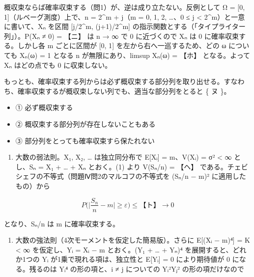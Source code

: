 \documentclass[
  10pt,
  a4paper,
]{article}
\providecommand{\tightlist}{%
  \setlength{\itemsep}{0pt}\setlength{\parskip}{0pt}}
\begin{document}
概収束ならば確率収束する（問1）が、逆は成り立たない。反例として Ω =
{[}0, 1{]}（ルベーグ測度）上で、n = 2\^{}m + j（m = 0, 1, 2, \ldots、0 ≤
j \textless{} 2\^{}m）と一意に書いて、X{\fallbackfont ₙ} を区間
{[}j/2\^{}m, (j+1)/2\^{}m{]}
の指示関数とする（「タイプライター列」）。P(X{\fallbackfont ₙ} ≠ 0) =
【ニ】 は n → ∞ で 0 に近づくので X{\fallbackfont ₙ} は 0
に確率収束する。しかし各 m ごとに区間が {[}0, 1{]}
を左から右へ一巡するため、どの ω についても X{\fallbackfont ₙ}(ω) = 1
となる n が無限にあり、limsup X{\fallbackfont ₙ}(ω) = 【ホ】
となる。よって X{\fallbackfont ₙ} はどの点でも 0 に収束しない。

もっとも、確率収束する列からは必ず概収束する部分列を取り出せる。すなわち、確率収束するが概収束しない列でも、適当な部分列をとると
\{ ヌ \}。

\begin{itemize}
\tightlist
\item
  ① 必ず概収束する
\item
  ② 概収束する部分列が存在しないこともある
\item
  ③ 部分列をとっても確率収束すら保たれない
\end{itemize}

\begin{enumerate}
\def\labelenumi{(\arabic{enumi})}
\setcounter{enumi}{2}
\tightlist
\item
  大数の弱法則。X{\fallbackfont ₁}, X{\fallbackfont ₂}, \ldots{}
  は独立同分布で E{[}X{\fallbackfont ᵢ}{]} = m、V(X{\fallbackfont ᵢ}) =
  σ² \textless{} ∞ とし、S{\fallbackfont ₙ} = X{\fallbackfont ₁} +
  \ldots{} + X{\fallbackfont ₙ} とおく。(1) より V(S{\fallbackfont ₙ}/n)
  = 【ヘ】 である。チェビシェフの不等式（問題Ⅳ問2のマルコフの不等式を
  (S{\fallbackfont ₙ}/n − m)² に適用したもの）から
\end{enumerate}

\[P\Big(\Big|\frac{S_n}{n} - m\Big| \ge \varepsilon\Big) \le \text{【ト】} \longrightarrow 0\]

となり、S{\fallbackfont ₙ}/n は m に確率収束する。

\begin{enumerate}
\def\labelenumi{(\arabic{enumi})}
\setcounter{enumi}{3}
\tightlist
\item
  大数の強法則（4次モーメントを仮定した簡易版）。さらに
  E{[}(X{\fallbackfont ᵢ} − m){\fallbackfont ⁴}{]} = K \textless{} ∞
  を仮定し、Y{\fallbackfont ᵢ} = X{\fallbackfont ᵢ} − m
  とおく。(Y{\fallbackfont ₁} + \ldots{} +
  Y{\fallbackfont ₙ}){\fallbackfont ⁴} を展開すると、どれか1つの
  Y{\fallbackfont ᵢ} が1乗で現れる項は、独立性と
  E{[}Y{\fallbackfont ᵢ}{]} = 0 により期待値が 0 になる。残るのは
  Y{\fallbackfont ᵢ⁴} の形の項と、i ≠ j についての
  Y{\fallbackfont ᵢ}²Y{\fallbackfont ⱼ}² の形の項だけなので
\end{enumerate}
\end{document}
